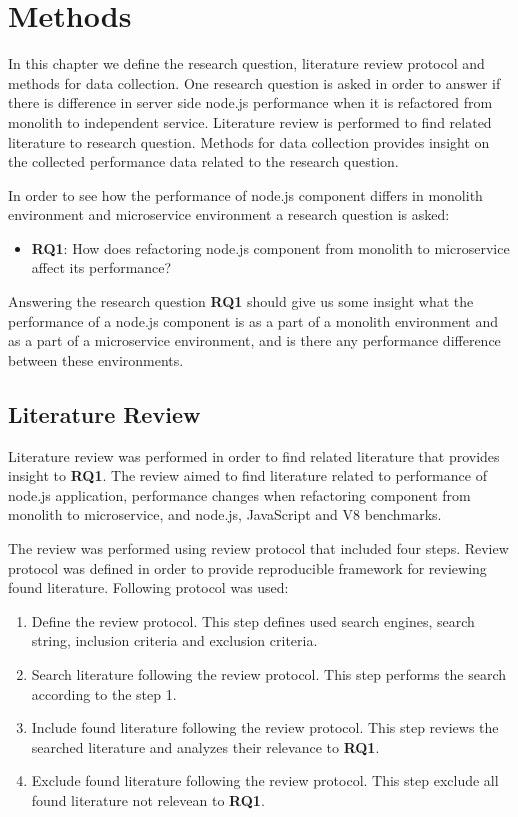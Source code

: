 \chapter{Methods\label{methods}}
In this chapter we define the research question, literature review protocol and methods for data collection.
One research question is asked in order to answer if there is difference in server side node.js performance when it is refactored from monolith to independent service.
Literature review is performed to find related literature to research question.
Methods for data collection provides insight on the collected performance data related to the research question.

In order to see how the performance of node.js component differs in monolith environment and microservice environment a research question is asked:
\begin{itemize}
    \item \textbf{RQ1}: How does refactoring node.js component from monolith to microservice affect its performance?
\end{itemize}

Answering the research question \textbf{RQ1} should give us some insight what the performance of a node.js component is as a part of a monolith environment and as a part of a microservice environment, and is there any performance difference between these environments.

\section{Literature Review}
Literature review was performed in order to find related literature that provides insight to \textbf{RQ1}.
The review aimed to find literature related to performance of node.js application, performance changes when refactoring component from monolith to microservice, and node.js, JavaScript and V8 benchmarks.

The review was performed using review protocol that included four steps.
Review protocol was defined in order to provide reproducible framework for reviewing found literature.
Following protocol was used:
\begin{enumerate}
    \item Define the review protocol. This step defines used search engines, search string, inclusion criteria and exclusion criteria.
    \item Search literature following the review protocol. This step performs the search according to the step 1.
    \item Include found literature following the review protocol. This step reviews the searched literature and analyzes their relevance to \textbf{RQ1}.
    \item Exclude found literature following the review protocol. This step exclude all found literature not relevean to \textbf{RQ1}.
\end{enumerate}

